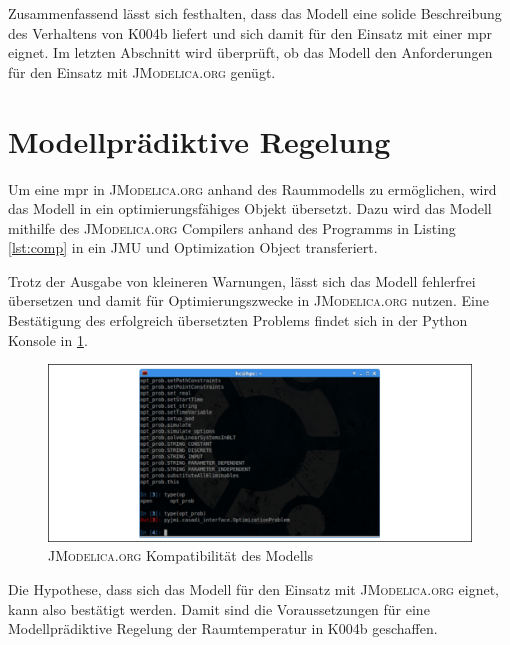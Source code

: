 Zusammenfassend lässt sich festhalten, dass das Modell eine solide Beschreibung des Verhaltens von K004b liefert und sich damit für den Einsatz mit einer \acrlong{mpr} eignet. Im letzten Abschnitt wird überprüft, ob das Modell den Anforderungen für den Einsatz mit \textsc{JModelica.org} genügt.

\section{Modellprädiktive Regelung}

Um eine \acrlong{mpr} in \textsc{JModelica.org} anhand des Raummodells zu ermöglichen, wird das Modell in ein optimierungsfähiges Objekt übersetzt. Dazu wird das Modell mithilfe des \textsc{JModelica.org} Compilers anhand des Programms in Listing \ref{lst:comp} in ein JMU und Optimization Object transferiert.



Trotz der Ausgabe von kleineren Warnungen, lässt sich das Modell fehlerfrei übersetzen und damit für Optimierungszwecke in \textsc{JModelica.org} nutzen. Eine Bestätigung des erfolgreich übersetzten Problems findet sich in der Python Konsole in \ref{fig:jmod}.

\begin{figure}
\centering
\includegraphics[width=\textwidth]{abbildungen/20160330_mpc}
\caption{\textsc{JModelica.org} Kompatibilität des Modells}
\label{fig:jmod}
\end{figure}

Die Hypothese, dass sich das Modell für den Einsatz mit \textsc{JModelica.org} eignet, kann also bestätigt werden.
Damit sind die Voraussetzungen für eine Modellprädiktive Regelung der Raumtemperatur in K004b geschaffen.